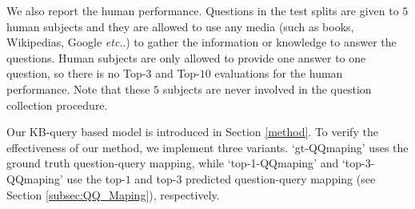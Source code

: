 \documentclass[10pt,journal]{IEEEtran}
\makeatletter
\DeclareRobustCommand\onedot{\futurelet\@let@token\@onedot}
\def\@onedot{\ifx\@let@token.\else.\null\fi\xspace}
\def\etc{\emph{etc}\onedot} \def\vs{\emph{vs}\onedot}
\def\bluetext{}
\makeatother
\begin{document}
\bluetext{We also report the human performance. Questions in the test splits are given to $5$ human subjects and they are allowed to use any media (such as books, Wikipedias, Google \etc) to gather the information or knowledge to answer the questions. Human subjects are only allowed to provide one answer to one question, so there is no Top-$3$ and Top-$10$ evaluations for the human performance. Note that these $5$ subjects are never involved in the question collection procedure.}

Our KB-query based model is introduced in Section \ref{method}. To verify the effectiveness of our method, we implement three variants. `{gt-QQmaping}' uses the ground truth question-query mapping,
while `{top-1-QQmaping}' and `{top-3-QQmaping}' use the top-$1$ and top-$3$ predicted question-query mapping (see Section \ref{subsec:QQ_Maping}), respectively.
\end{document}
